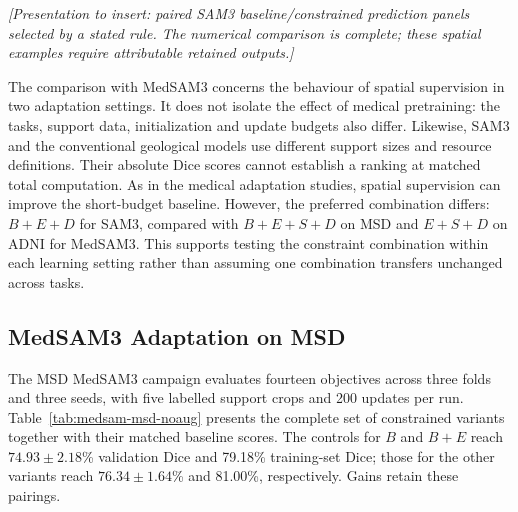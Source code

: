 \documentclass[12pt,a4paper]{article}
\begin{document}
\noindent\textit{[Presentation to insert: paired SAM3 baseline/constrained
prediction panels selected by a stated rule. The numerical comparison
is complete; these spatial examples require attributable retained outputs.]}

The comparison with MedSAM3 concerns the behaviour of spatial supervision
in two adaptation settings. It does not isolate the effect of medical
pretraining: the tasks, support data, initialization and update budgets
also differ. Likewise, SAM3 and the conventional geological models use
different support sizes and resource definitions. Their absolute Dice
scores cannot establish a ranking at matched total computation.
As in the medical adaptation studies, spatial supervision can improve
the short-budget baseline. However, the preferred combination differs:
$B+E+D$ for SAM3, compared with $B+E+S+D$ on MSD and $E+S+D$
on ADNI for MedSAM3. This supports testing the constraint combination
within each learning setting rather than assuming one combination
transfers unchanged across tasks.




\FloatBarrier
\subsection{MedSAM3 Adaptation on MSD}
\label{sec:medsam-results}

The MSD MedSAM3 campaign evaluates fourteen objectives across three
folds and three seeds, with five labelled support crops and 200 updates
per run. Table~\ref{tab:medsam-msd-noaug} presents the complete set of
constrained variants together with their matched baseline scores.
The controls for $B$ and $B+E$ reach $74.93\pm2.18$\% validation Dice
and 79.18\% training-set Dice; those for the other variants reach
$76.34\pm1.64$\% and 81.00\%, respectively. Gains retain these pairings.
\end{document}
